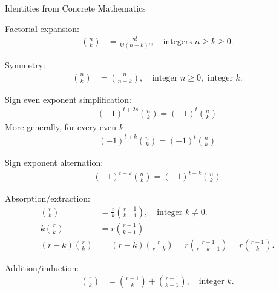 Identities from Concrete Mathematics~\cite[p. 174]{graham1994concrete}
\begin{identity}
    Factorial expansion:
    \begin{align*}
        \binom{n}{k} &= \frac{n!}{k!(n-k)!}, \quad \text{integers } n \geq k \geq 0.
    \end{align*}
\end{identity}

\begin{identity}
    Symmetry:
    \begin{align*}
        \binom{n}{k} &= \binom{n}{n-k}, \quad \text{integer } n \geq 0, \text{ integer } k.
    \end{align*}
\end{identity}

\begin{identity}
    Sign even exponent simplification:
    \begin{align*}
    (-1)^{t+2s} \binom{n}{k} = (-1)^{t} \binom{n}{k}
    \end{align*}
    More generally, for every even $k$
    \begin{align*}
    (-1)^{t+k} \binom{n}{k} = (-1)^{t} \binom{n}{k}
    \end{align*}
\end{identity}

\begin{identity}
    Sign exponent alternation:
    \begin{align*}
    (-1)^{t+k} \binom{n}{k} = (-1)^{t-k} \binom{n}{k}
    \end{align*}
\end{identity}

\begin{identity}
    Absorption/extraction:
    \begin{align*}
        \binom{r}{k} &= \frac{r}{k} \binom{r-1}{k-1}, \quad \text{integer } k \neq 0. \\
        k \binom{r}{k} &= r \binom{r-1}{k-1} \\
        (r-k) \binom{r}{k} &= (r-k) \binom{r}{r-k} = r \binom{r-1}{r-k-1} = r \binom{r-1}{k}.
    \end{align*}
\end{identity}

\begin{identity}
    Addition/induction:
    \begin{align*}
        \binom{r}{k} &= \binom{r-1}{k} + \binom{r-1}{k-1}, \quad \text{integer } k.
    \end{align*}
\end{identity}

